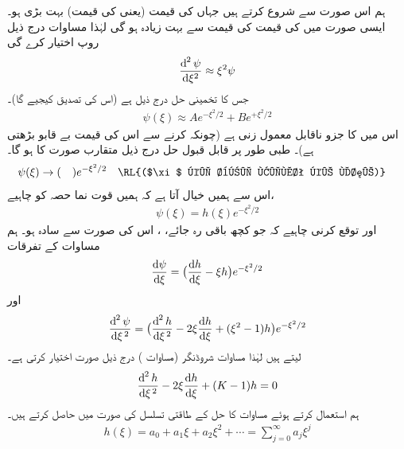 ہم اس صورت سے شروع کرتے ہیں جہاں  کی قیمت (یعنی  کی قیمت) بہت بڑی ہو۔ ایسی صورت میں
 کی قیمت  کی قیمت سے بہت زیادہ ہو گی لہٰذا مساوات  درج ذیل روپ اختیار کرے گی
\begin{align}
\frac{\dif^{\,2}\psi}{\dif \xi^{2}}\approx \xi^{2}\psi
\end{align}
جس کا تخمینی حل درج ذیل ہے (اس کی تصدیق کیجیے گا)۔ 
\begin{align}\label{مساوات_غیر_تابع_وقت_متقارب_حل}
\psi(\xi)\approx Ae^{-\xi^{2}/2}+Be^{+\xi^{2}/2}
\end{align}
 اس میں  کا جزو   ناقابل  معمول زنی  ہے (چونکہ  کرنے سے اس کی قیمت بے قابو بڑھتی ہے)۔ طبی طور پر قابل قبول حل درج ذیل متقارب صورت کا ہو گا۔
\begin{align}
\psi(\xi)&\to(\quad )e^{-\xi^{2}/2}&&\text{\RL{($\xi$ کی بڑی قیمت کے لئے)}}
\end{align}
اس سے ہمیں خیال آتا ہے کہ ہمیں قوت نما حصہ کو  چاہیے،
\begin{align}\label{مساوات_شروڈنگر_متقارب_الف}
\psi(\xi)=h(\xi)e^{-\xi^{2}/2}
\end{align}
اور توقع کرنی چاہیے کہ جو کچھ باقی رہ جائے، ، اس کی صورت  سے سادہ ہو۔ ہم مساوات  کے تفرقات
\begin{align*}
\frac{\dif{\psi}}{\dif{\xi}}=\big(\frac{\dif{h}}{\dif{\xi}}-\xi h\big )e^{-\xi^{2}/2}
\end{align*}
اور
\begin{align*}
\frac{\dif^{\,2}{\psi}}{\dif{\xi^{\,2}}}=\big (\frac{\dif^{\,2}{h}}{\dif{\xi^{\,2}}}-2\xi\frac{\dif{h}}{\dif{\xi}}+(\xi^{2}-1)h\big )e^{-\xi^{2}/2}
\end{align*}
 لیتے ہیں لہٰذا مساوات شروڈنگر (مساوات ) درج ذیل صورت اختیار کرتی ہے۔
\begin{align}\label{مساوات_شروڈنگر_فروبنیوس_الف}
\frac{\dif^{\,2}{h}}{\dif{\xi^{\,2}}}-2\xi\frac{\dif{h}}{\dif{\xi}}+(K-1)h=0
\end{align}
ہم  استعمال کرتے ہوئے مساوات  کا حل  کے طاقتی تسلسل کی صورت میں حاصل کرتے ہیں۔ 
\begin{align}
h(\xi)=a_{0}+a_{1}\xi+a_{2}\xi^{2}+\cdots = \sum_{j=0}^{\infty}a_{j}\xi^{j}
\end{align}
